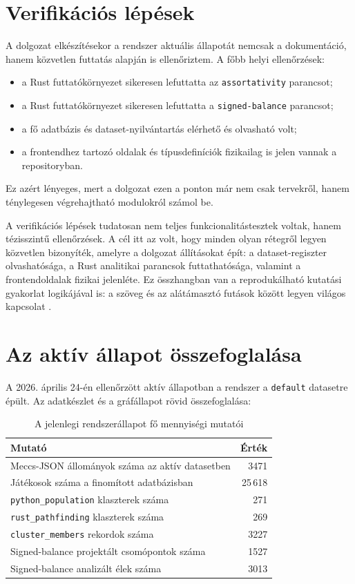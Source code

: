 \documentclass[a4paper,12pt]{report}
\begin{document}
\section{Verifikációs lépések}

A dolgozat elkészítésekor a rendszer aktuális állapotát nemcsak a dokumentáció, hanem közvetlen futtatás alapján is ellenőriztem. A főbb helyi ellenőrzések:

\begin{itemize}
    \item a Rust futtatókörnyezet sikeresen lefuttatta az \texttt{assortativity} parancsot;
    \item a Rust futtatókörnyezet sikeresen lefuttatta a \texttt{signed-balance} parancsot;
    \item a fő adatbázis és dataset-nyilvántartás elérhető és olvasható volt;
    \item a frontendhez tartozó oldalak és típusdefiníciók fizikailag is jelen vannak a repositoryban.
\end{itemize}

Ez azért lényeges, mert a dolgozat ezen a ponton már nem csak tervekről, hanem ténylegesen végrehajtható modulokról számol be.

A verifikációs lépések tudatosan nem teljes funkcionalitástesztek voltak, hanem tézisszintű ellenőrzések. A cél itt az volt, hogy minden olyan rétegről legyen közvetlen bizonyíték, amelyre a dolgozat állításokat épít: a dataset-regiszter olvashatósága, a Rust analitikai parancsok futtathatósága, valamint a frontendoldalak fizikai jelenléte. Ez összhangban van a reprodukálható kutatási gyakorlat logikájával is: a szöveg és az alátámasztó futások között legyen világos kapcsolat \cite{sandve2013}.

\section{Az aktív állapot összefoglalása}

A 2026. április 24-én ellenőrzött aktív állapotban a rendszer a \texttt{default} datasetre épült. Az adatkészlet és a gráfállapot rövid összefoglalása:

\begin{table}[H]
\centering
\caption{A jelenlegi rendszerállapot fő mennyiségi mutatói}
\begin{tabular}{lr}
\toprule
\textbf{Mutató} & \textbf{Érték} \\
\midrule
Meccs-JSON állományok száma az aktív datasetben & 3471 \\
Játékosok száma a finomított adatbázisban & 25\,618 \\
\texttt{python\_population} klaszterek száma & 271 \\
\texttt{rust\_pathfinding} klaszterek száma & 269 \\
\texttt{cluster\_members} rekordok száma & 3227 \\
Signed-balance projektált csomópontok száma & 1527 \\
Signed-balance analizált élek száma & 3013 \\
\bottomrule
\end{tabular}
\end{table}
\end{document}
